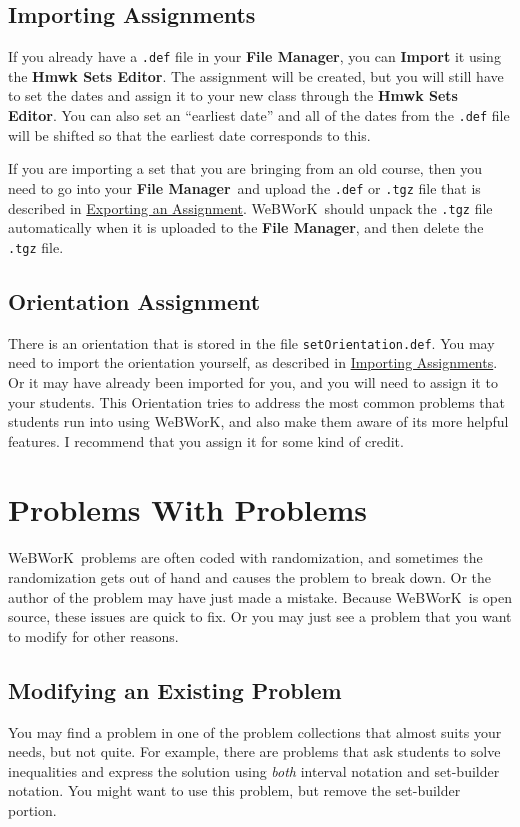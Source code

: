 \documentclass[12pt]{article}
\newcommand{\menu}[1]{\textbf{#1}}
\newcommand{\WW}{WeBWorK}
\newcommand{\HSE}{\menu{Hmwk Sets Editor}}
\newcommand{\FM}{\menu{File Manager}}
\begin{document}
\subsection{Importing Assignments}\label{imp}
If you already have  a \texttt{.def} file in your \FM, you can \menu{Import} it using the \HSE.  The assignment will be created, but you will still have to set the dates  and assign it to your new class through the \HSE. You can also set an ``earliest date'' and all of the dates from the \texttt{.def} file will be shifted so that the earliest date corresponds to this.

If you are importing a set that you are bringing from an old course, then you need to go into your \FM\ and upload the \texttt{.def} or \texttt{.tgz} file that is described in \hyperref[exp]{Exporting an Assignment}.  \WW\ should unpack the \texttt{.tgz} file automatically when it is uploaded to the \FM, and then delete the \texttt{.tgz} file.

\subsection{Orientation Assignment}\label{orientation}
There is an orientation that is stored in the file \texttt{setOrientation.def}. You may need to import the orientation yourself, as described in \hyperref[imp]{Importing Assignments}.  Or it may have already been imported for you, and you will need to assign it to your students. This Orientation tries to address the most common problems that students run into using \WW, and also make them aware of its more helpful features.  I recommend that you assign it for some kind of credit.

\section{Problems With Problems}
\WW\ problems are often coded with randomization, and sometimes the randomization gets out of hand and causes the problem to break down. Or the author of the problem may have just made a mistake. Because \WW\ is open source, these issues are quick to fix. Or you may just see a problem that you want to modify for other reasons.

\subsection{Modifying an Existing Problem}

You may find a problem in one of the problem collections that almost suits your needs, but not quite.  For example, there are problems that ask students to solve inequalities and express the solution using \emph{both} interval notation and set-builder notation.  You might want to use this problem, but remove the set-builder portion.
\end{document}
